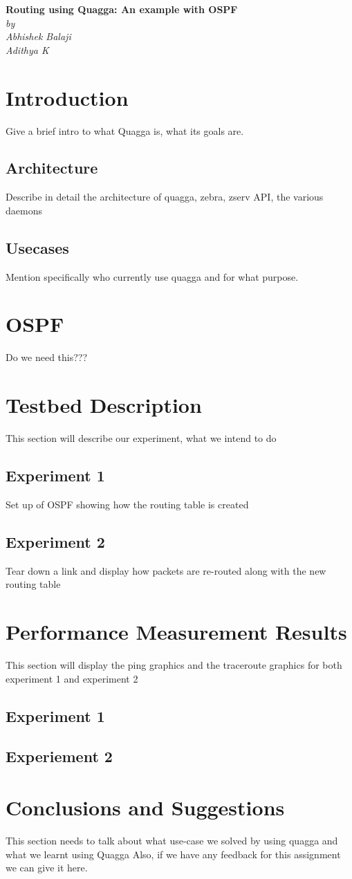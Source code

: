 \documentclass{article}
\begin{document}
\begin{titlepage}
\begin{center}
    \Large\textbf{Routing using Quagga: An example with OSPF}\\
    \textit{by}\\
    \large\textit{Abhishek Balaji \\ Adithya K}
\end{center}
\end{titlepage}
\tableofcontents
\clearpage
\section{Introduction}
Give a brief intro to what Quagga is, what its goals are.
\subsection{Architecture}
Describe in detail the architecture of quagga, zebra, zserv API, the various daemons
\subsection{Usecases}
Mention specifically who currently use quagga and for what purpose.
\clearpage
\section{OSPF}
Do we need this???
\clearpage
\section{Testbed Description}
This section will describe our experiment, what we intend to do
\subsection{Experiment 1}
Set up of OSPF showing how the routing table is created
\subsection{Experiment 2}
Tear down a link and display how packets are re-routed along with the new routing table
\clearpage
\section{Performance Measurement Results}
This section will display the ping graphics and the traceroute graphics for both experiment 1 and experiment 2
\subsection{Experiment 1}
\subsection{Experiement 2}
\clearpage
\section{Conclusions and Suggestions}
This section needs to talk about what use-case we solved by using quagga and what we learnt using Quagga
Also, if we have any feedback for this assignment we can give it here.
\end{document}

